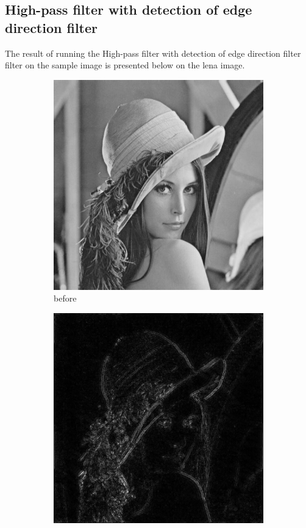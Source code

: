 \documentclass[12pt]{article}
\begin{document}
\subsection{High-pass filter with detection of edge direction filter}
 The result of running the High-pass filter with detection of edge direction filter filter on the sample image is presented below on the lena image.
\begin{figure}[H]\centering
    \begin{subfigure}[t]{\subfiguresize}\centering
        \includegraphics[width=\textwidth]{img/lena.png}
        \caption{before}
    \end{subfigure}
    \hspace{2em}
    \begin{subfigure}[t]{\subfiguresize}\centering
        \includegraphics[width=\textwidth]{img/lena_edge.png}

\end{subfigure}
\end{figure}
\end{document}
